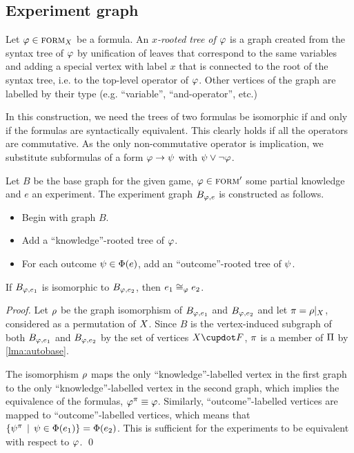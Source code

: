 \subsection{Experiment graph}

Let $\varphi\in\textsc{form}_X$ be a formula.
An \emph{$x$-rooted tree of $\varphi$}
  is a graph created from the syntax tree of $\varphi$
  by unification of leaves that correspond to the same variables
  and adding a special vertex with label $x$ that is connected to the root
  of the syntax tree, i.e. to the top-level operator of $\varphi$.
Other vertices of the graph are labelled by their type (e.g. ``variable'', ``and-operator'', etc.)

In this construction, we need the trees of two formulas be isomorphic if
  and only if the formulas are syntactically equivalent.
This clearly holds if all the operators are commutative.
As the only non-commutative operator is implication, we substitute
subformulas of a form $\varphi -> \psi$ with $\psi \vee \neg\varphi$.

Let $B$ be the base graph for the given game, $\varphi\in{\textsc{form}'}$ some partial knowledge
  and $e$ an experiment.
The experiment graph $B_{\varphi, e}$ is constructed as follows.
\begin{itemize}
\item Begin with graph $B$.
\item Add a ``knowledge''-rooted tree of $\varphi$.
\item For each outcome $\psi\in\Phi(e)$, add an ``outcome''-rooted tree of $\psi$.
\end{itemize}

\begin{theorem} \label{thm:isoequiv}
If $B_{\varphi, e_1}$ is isomorphic to $B_{\varphi, e_2}$, then
 $e_1 \cong_{\varphi} e_2$.
\end{theorem}

\begin{proof}
Let $\rho$ be the graph isomorphism of $B_{\varphi, e_1}$ and $B_{\varphi, e_2}$ and let
  $\pi = \rho|_X$, considered as a permutation of $X$.
Since $B$ is the vertex-induced subgraph of both $B_{\varphi,e_1}$ and $B_{\varphi, e_2}$ by
  the set of vertices $\Var\cupdot F$, $\pi$ is a member of $\Pi$ by \autoref{lma:autobase}.

The isomorphism $\rho$ maps the only ``knowledge''-labelled vertex in the first graph
  to the only ``knowledge''-labelled vertex in the second graph,
  which implies the equivalence of the formulas, $\varphi^\pi \equiv \varphi$.
Similarly, ``outcome''-labelled vertices are mapped to ``outcome''-labelled vertices,
  which means that $\{\psi^\pi \:\:|\:\: \psi\in\Phi(e_1)\} = \Phi(e_2)$.
This is sufficient for the experiments to be equivalent with respect to $\varphi$.
  \qed
\end{proof}

